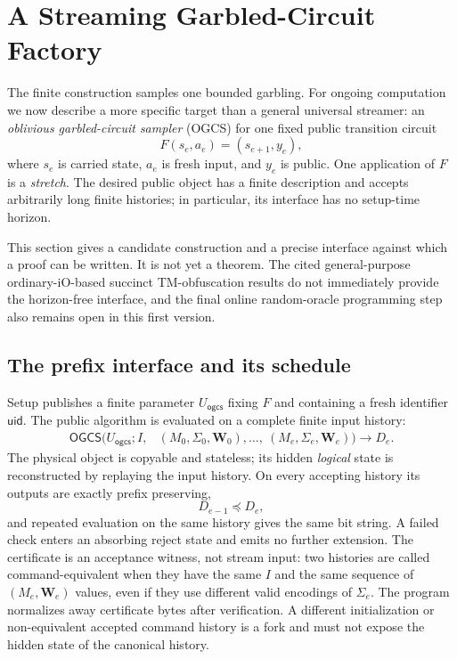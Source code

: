\section{A Streaming Garbled-Circuit Factory}
\label{sec:ongoing}

The finite construction samples one bounded garbling.  For ongoing
computation we now describe a more specific target than a general universal
streamer: an \emph{oblivious garbled-circuit sampler} (OGCS) for one fixed
public transition circuit
\[
  F(s_e,a_e)=(s_{e+1},y_e),
\]
where $s_e$ is carried state, $a_e$ is fresh input, and $y_e$ is public.  One
application of $F$ is a \emph{stretch}.  The desired public object has a finite
description and accepts arbitrarily long finite histories; in particular, its
interface has no setup-time horizon.

This section gives a candidate construction and a precise interface against
which a proof can be written.  It is not yet a theorem.  The cited
general-purpose ordinary-iO-based succinct TM-obfuscation results do not
immediately provide the horizon-free interface, and the final online
random-oracle programming step also remains open in this first version.

\subsection{The prefix interface and its schedule}

Setup publishes a finite parameter $U_{\mathsf{ogcs}}$ fixing $F$ and
containing a fresh identifier $\mathsf{uid}$.  The public algorithm is
evaluated on a complete finite input history:
\[
\begin{split}
  \mathsf{OGCS}(U_{\mathsf{ogcs}};I,
     &(M_0,\Sigma_0,\mathbf W_0),\ldots,\
       (M_e,\Sigma_e,\mathbf W_e))
       \longrightarrow D_e .
  \label{eq:ogcs-interface}
\end{split}
\]
The physical object is copyable and stateless; its hidden \emph{logical}
state is reconstructed by replaying the input history.  On every accepting
history its outputs are exactly prefix preserving,
\[
  D_{e-1}\preceq D_e,
\]
and repeated evaluation on the same history gives the same bit string.  A
failed check enters an absorbing reject state and emits no further extension.
The certificate is an acceptance witness, not stream input: two histories are
called command-equivalent when they have the same $I$ and the same sequence of
$(M_e,\mathbf W_e)$ values, even if they use different valid encodings of
$\Sigma_e$.  The program normalizes away certificate bytes after verification.
A different initialization or non-equivalent accepted command history is a
fork and must not expose the hidden state of the canonical history.


